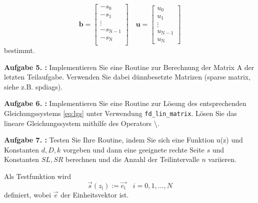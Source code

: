 \begin{equation}
	\mathbf{b}=\begin{bmatrix}
	-	s_0 \\
	-	s_1 \\
		\vdots \\
	-	s_{\mathrm{N}-1} \\
	-	s_{\mathrm{N}} \\
	\end{bmatrix} \quad \mathbf{u}=\begin{bmatrix}
		u_0 \\
		u_1 \\
		\vdots \\
		u_{\mathrm{N}-1} \\
		u_\mathrm{N}
	\end{bmatrix}
\end{equation}
bestimmt.
\pagebreak
\begin{mybox}
	\textbf{Aufgabe 5. :} Implementieren Sie eine Routine zur Berechnung der Matrix A der letzten Teilaufgabe. Verwenden
	Sie dabei dünnbesetzte Matrizen (sparse matrix, siehe z.B. spdiags).
\end{mybox}
\begin{figure}[htb]
	
\end{figure}
\clearpage
\begin{mybox}
	\textbf{Aufgabe 6. :} 
	Implementieren Sie eine Routine zur Lösung des entsprechenden Gleichungssystems \cref{eq:lgs} unter Verwendung
\verb*|fd_lin_matrix|. Lösen Sie das lineare Gleichungssystem mithilfe des Operators \textbackslash .
\end{mybox}


\begin{figure}[htb]
	
	\end{figure}

\begin{mybox}
	\textbf{Aufgabe 7. :} Testen Sie Ihre Routine, indem Sie sich eine Funktion u(z) und Konstanten $d, D, k$ vorgeben und
	dann eine geeignete rechte Seite $s$ und Konstanten $SL, SR$ berechnen und die Anzahl der Teilintervalle
	$n$ variieren.
\end{mybox}
Als Testfunktion wird
\begin{equation}
	\vec{s}(z_\mathrm{i}):=\vec{e_\mathrm{i}}\quad i=0,1,\dots,N
\end{equation}
definiert, wobei $\vec{e}$ der Einheitsvektor ist.

